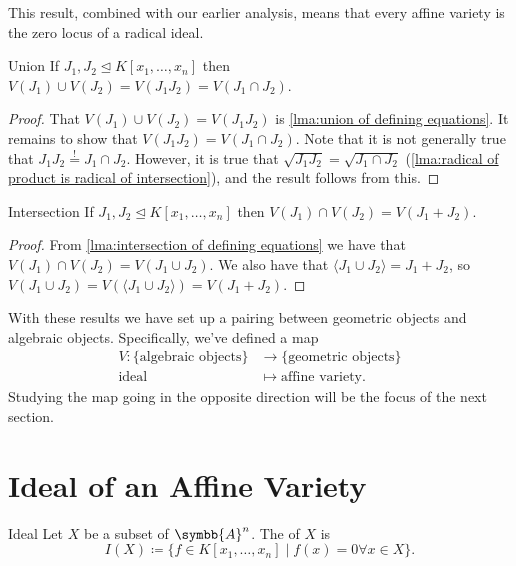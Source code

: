 \documentclass[fleqn]{NotesClass}
\newcommand{\subideal}{\trianglelefteq}
\newcommand{\affine}{\symbb{A}}
\begin{document}
    This result, combined with our earlier analysis, means that every affine variety is the zero locus of a radical ideal.
    
    \begin{lma}{Union}{}
        If \(J_1, J_2 \subideal K[x_1, \dotsc, x_n]\) then \(V(J_1) \cup V(J_2) = V(J_1 J_2) = V(J_1 \cap J_2)\).
        \begin{proof}
            That \(V(J_1) \cup V(J_2) = V(J_1 J_2)\) is \cref{lma:union of defining equations}.
            It remains to show that \(V(J_1 J_2) = V(J_1 \cap J_2)\).
            Note that it is not generally true that \(J_1 J_2 \stackrel{!}{=} J_1 \cap J_2\).
            However, it is true that \(\sqrt{J_1J_2} = \sqrt{J_1 \cap J_2}\) (\cref{lma:radical of product is radical of intersection}), and the result follows from this.
        \end{proof}
    \end{lma}
    
    \begin{lma}{Intersection}{}
        If \(J_1, J_2 \subideal K[x_1, \dotsc, x_n]\) then \(V(J_1) \cap V(J_2) = V(J_1 + J_2)\).
        \begin{proof}
            From \cref{lma:intersection of defining equations} we have that \(V(J_1) \cap V(J_2) = V(J_1 \cup J_2)\).
            We also have that \(\langle J_1 \cup J_2 \rangle = J_1 + J_2\), so \(V(J_1 \cup J_2) = V(\langle J_1 \cup J_2 \rangle) = V(J_1 + J_2)\).
        \end{proof}
    \end{lma}
    
    \begin{remark}{}{}
        With these results we have set up a pairing between geometric objects and algebraic objects.
        Specifically, we've defined a map
        \begin{align}
            V \colon \{\text{algebraic objects}\} &\to \{\text{geometric objects}\}\\
            \text{ideal} &\mapsto \text{affine variety}.
        \end{align}
        Studying the map going in the opposite direction will be the focus of the next section.
    \end{remark}
    
    \section{Ideal of an Affine Variety}
    \begin{dfn}{Ideal}{}
        Let \(X\) be a subset of \(\affine^n\).
        The  of \(X\) is
        \begin{equation}
            I(X) \coloneq \{f \in K[x_1, \dotsc, x_n] \mid f(x) = 0 \forall x \in X\}.
        \end{equation}
    \end{dfn}
    
\end{document}
